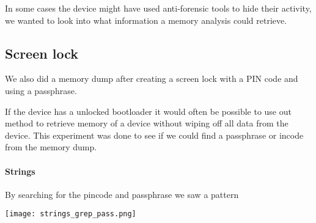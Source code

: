   In some cases the device might have used anti-forensic tools to hide their 
  activity, we wanted to look into what information a memory analysis could 
  retrieve.
  \subsection{Screen lock}
  We also did a memory dump after creating a screen lock with a PIN code and using a passphrase.
  
  If the device has a unlocked bootloader it would often be possible to use out 
  method to retrieve memory of a device without wiping off all data from the 
  device. This experiment was done to see if we could find a passphrase or 
  incode from the memory dump.

  \paragraph{Strings}
  By searching for the pincode and passphrase we saw a pattern 
  
  \texttt{[image: strings\_grep\_pass.png]}
